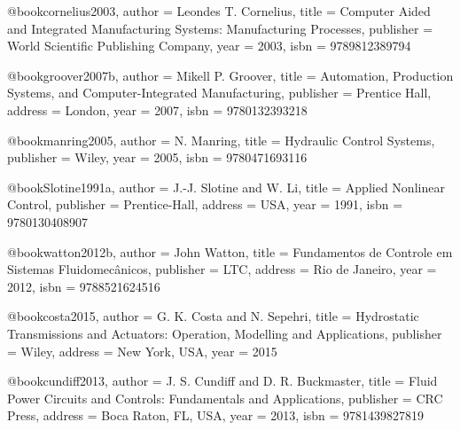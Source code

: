 @book{cornelius2003,
  author = {Leondes T. Cornelius},
  title = {Computer Aided and Integrated Manufacturing Systems: Manufacturing Processes},
  publisher = {World Scientific Publishing Company},
  year = {2003},
  isbn = {9789812389794}
}

@book{groover2007b,
  author = {Mikell P. Groover},
  title = {Automation, Production Systems, and Computer-Integrated Manufacturing},
  publisher = {Prentice Hall},
  address = {London},
  year = {2007},
  isbn = {9780132393218}
}

%

@book{manring2005,
  author = {N. Manring},
  title = {Hydraulic Control Systems},
  publisher = {Wiley},
  year = {2005},
  isbn = {9780471693116}
}

@book{Slotine1991a,
  author = {J.-J. Slotine and W. Li},
  title = {Applied Nonlinear Control},
  publisher = {Prentice-Hall},
  address = {USA},
  year = {1991},
  isbn = {9780130408907}
}

@book{watton2012b,
  author = {John Watton},
  title = {Fundamentos de Controle em Sistemas Fluidomecânicos},
  publisher = {LTC},
  address = {Rio de Janeiro},
  year = {2012},
  isbn = {9788521624516}
}

@book{costa2015,
  author = {G. K. Costa and N. Sepehri},
  title = {Hydrostatic Transmissions and Actuators: Operation, Modelling and Applications},
  publisher = {Wiley},
  address = {New York, USA},
  year = {2015}
}

@book{cundiff2013,
  author = {J. S. Cundiff and D. R. Buckmaster},
  title = {Fluid Power Circuits and Controls: Fundamentals and Applications},
  publisher = {CRC Press},
  address = {Boca Raton, FL, USA},
  year = {2013},
  isbn = {9781439827819}
}

